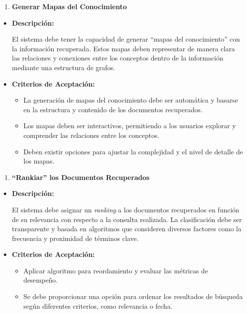 \documentclass[
  12pt,
  openany]{book}
\providecommand{\tightlist}{%
  \setlength{\itemsep}{0pt}\setlength{\parskip}{0pt}}
\begin{document}
\begin{enumerate}
\def\labelenumi{\arabic{enumi}.}
\setcounter{enumi}{3}
\tightlist
\item
  \textbf{Generar Mapas del Conocimiento}
\end{enumerate}

\begin{itemize}
\item
  \textbf{Descripción:}

  El sistema debe tener la capacidad de generar ``mapas del conocimiento'' con la información recuperada. Estos mapas deben representar de manera clara las relaciones y conexiones entre los conceptos dentro de la información mediante una estructura de grafos.
\item
  \textbf{Criterios de Aceptación:}

  \begin{itemize}
  \item
    La generación de mapas del conocimiento debe ser automática y basarse en la estructura y contenido de los documentos recuperados.
  \item
    Los mapas deben ser interactivos, permitiendo a los usuarios explorar y comprender las relaciones entre los conceptos.
  \item
    Deben existir opciones para ajustar la complejidad y el nivel de detalle de los mapas.
  \end{itemize}
\end{itemize}

\begin{enumerate}
\def\labelenumi{\arabic{enumi}.}
\setcounter{enumi}{4}
\tightlist
\item
  \textbf{``Rankiar'' los Documentos Recuperados}
\end{enumerate}

\begin{itemize}
\item
  \textbf{Descripción:}

  El sistema debe asignar un \emph{ranking} a los documentos recuperados en función de su relevancia con respecto a la consulta realizada. La clasificación debe ser transparente y basada en algoritmos que consideren diversos factores como la frecuencia y proximidad de términos clave.
\item
  \textbf{Criterios de Aceptación:}

  \begin{itemize}
  \item
    Aplicar algoritmo para reordamiento y evaluar las métricas de desempeño.
  \item
    Se debe proporcionar una opción para ordenar los resultados de búsqueda según diferentes criterios, como relevancia o fecha.
  \end{itemize}
\end{itemize}
\end{document}

